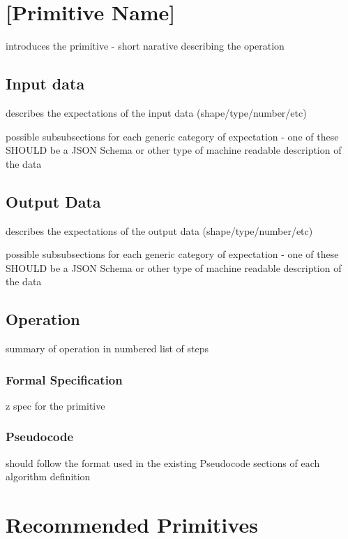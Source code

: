 \documentclass[../../main.tex]{subfiles}
\begin{document}
\section{[Primitive Name]}

introduces the primitive - short narative describing the operation

\subsection{Input data}

describes the expectations of the input data (shape/type/number/etc)

possible subsubsections for each generic category of expectation
- one of these SHOULD be a JSON Schema or other type of machine readable description of the data

\subsection{Output Data}

describes the expectations of the output data (shape/type/number/etc)

possible subsubsections for each generic category of expectation
- one of these SHOULD be a JSON Schema or other type of machine readable description of the data

\subsection{Operation}

summary of operation in numbered list of steps

\subsubsection{Formal Specification}

z spec for the primitive

\subsubsection{Pseudocode}

should follow the format used in the existing Pseudocode sections of each algorithm definition

\section{Recommended Primitives}
\end{document}
